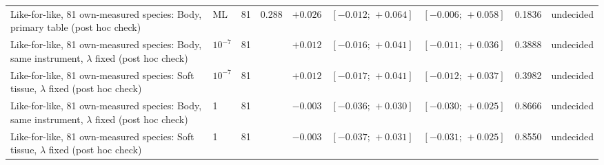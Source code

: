 \begin{table}
\begin{tabular}{@{}>{\raggedright\arraybackslash}p{10.6cm}lrrrccrl@{}}
Like-for-like, 81 own-measured species: Body, primary table (post hoc check) & ML & 81 & 0.288 & $+0.026$ & $[-0.012;\,+0.064]$ & $[-0.006;\,+0.058]$ & 0.1836 & undecided \\
Like-for-like, 81 own-measured species: Body, same instrument, $\lambda$ fixed (post hoc check) & $10^{-7}$ & 81 &  & $+0.012$ & $[-0.016;\,+0.041]$ & $[-0.011;\,+0.036]$ & 0.3888 & undecided \\
Like-for-like, 81 own-measured species: Soft tissue, $\lambda$ fixed (post hoc check) & $10^{-7}$ & 81 &  & $+0.012$ & $[-0.017;\,+0.041]$ & $[-0.012;\,+0.037]$ & 0.3982 & undecided \\
Like-for-like, 81 own-measured species: Body, same instrument, $\lambda$ fixed (post hoc check) & 1 & 81 &  & $-0.003$ & $[-0.036;\,+0.030]$ & $[-0.030;\,+0.025]$ & 0.8666 & undecided \\
Like-for-like, 81 own-measured species: Soft tissue, $\lambda$ fixed (post hoc check) & 1 & 81 &  & $-0.003$ & $[-0.037;\,+0.031]$ & $[-0.031;\,+0.025]$ & 0.8550 & undecided \\
\bottomrule
\end{tabular}
\end{table}
